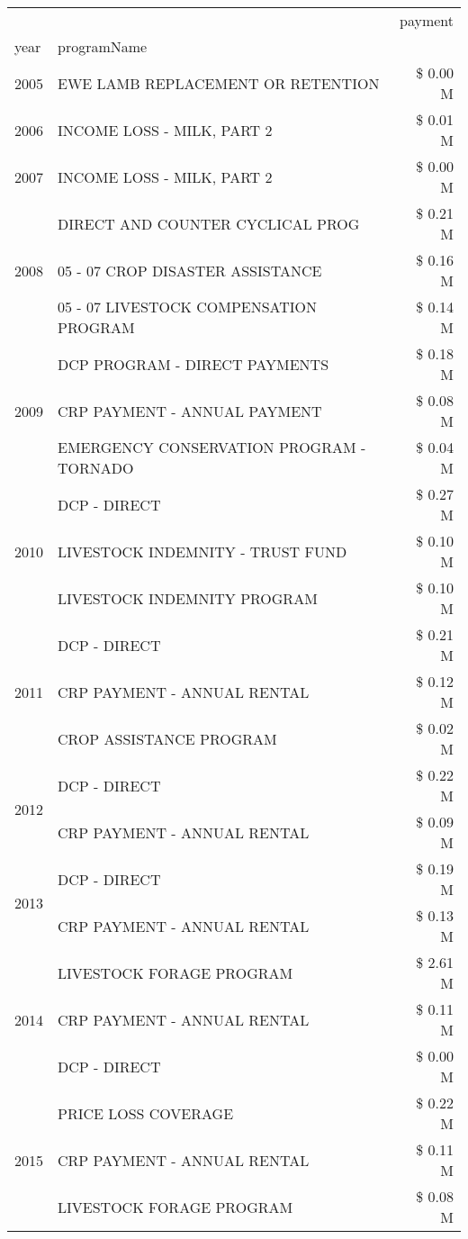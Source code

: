 \begin{tabular}{llr}
\toprule
 &  & payment \\
year & programName &  \\
\midrule
2005 & EWE LAMB REPLACEMENT OR RETENTION & \$ 0.00 M \\
\cline{1-3}
2006 & INCOME LOSS - MILK, PART 2 & \$ 0.01 M \\
\cline{1-3}
2007 & INCOME LOSS - MILK, PART 2 & \$ 0.00 M \\
\cline{1-3}
\multirow[t]{3}{*}{2008} & DIRECT AND COUNTER CYCLICAL PROG & \$ 0.21 M \\
 & 05 - 07 CROP DISASTER ASSISTANCE & \$ 0.16 M \\
 & 05 - 07 LIVESTOCK COMPENSATION PROGRAM & \$ 0.14 M \\
\cline{1-3}
\multirow[t]{3}{*}{2009} & DCP PROGRAM - DIRECT PAYMENTS & \$ 0.18 M \\
 & CRP PAYMENT - ANNUAL PAYMENT & \$ 0.08 M \\
 & EMERGENCY CONSERVATION PROGRAM - TORNADO & \$ 0.04 M \\
\cline{1-3}
\multirow[t]{3}{*}{2010} & DCP - DIRECT & \$ 0.27 M \\
 & LIVESTOCK INDEMNITY - TRUST FUND & \$ 0.10 M \\
 & LIVESTOCK INDEMNITY PROGRAM & \$ 0.10 M \\
\cline{1-3}
\multirow[t]{3}{*}{2011} & DCP - DIRECT & \$ 0.21 M \\
 & CRP PAYMENT - ANNUAL RENTAL & \$ 0.12 M \\
 & CROP ASSISTANCE PROGRAM & \$ 0.02 M \\
\cline{1-3}
\multirow[t]{2}{*}{2012} & DCP - DIRECT & \$ 0.22 M \\
 & CRP PAYMENT - ANNUAL RENTAL & \$ 0.09 M \\
\cline{1-3}
\multirow[t]{2}{*}{2013} & DCP - DIRECT & \$ 0.19 M \\
 & CRP PAYMENT - ANNUAL RENTAL & \$ 0.13 M \\
\cline{1-3}
\multirow[t]{3}{*}{2014} & LIVESTOCK FORAGE PROGRAM & \$ 2.61 M \\
 & CRP PAYMENT - ANNUAL RENTAL & \$ 0.11 M \\
 & DCP - DIRECT & \$ 0.00 M \\
\cline{1-3}
\multirow[t]{3}{*}{2015} & PRICE LOSS COVERAGE & \$ 0.22 M \\
 & CRP PAYMENT - ANNUAL RENTAL & \$ 0.11 M \\
 & LIVESTOCK FORAGE PROGRAM & \$ 0.08 M \\

\end{tabular}
